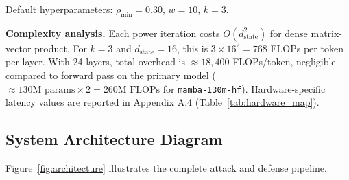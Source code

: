 \documentclass[10pt,twocolumn]{article}
\begin{document}
Default hyperparameters: $\rho_{\min}=0.30$, $w=10$, $k=3$.

\textbf{Complexity analysis.} Each power iteration costs $O(d_{\text{state}}^2)$ for dense matrix-vector product. For $k=3$ and $d_{\text{state}}=16$, this is $3 \times 16^2 = 768$ FLOPs per token per layer. With 24 layers, total overhead is $\approx 18{,}400$ FLOPs/token, negligible compared to forward pass on the primary model ($\approx 130\text{M params} \times 2 = 260\text{M FLOPs}$ for \texttt{mamba-130m-hf}). Hardware-specific latency values are reported in Appendix A.4 (Table~\ref{tab:hardware_map}).

\subsection{System Architecture Diagram}

Figure~\ref{fig:architecture} illustrates the complete attack and defense pipeline.
\end{document}
